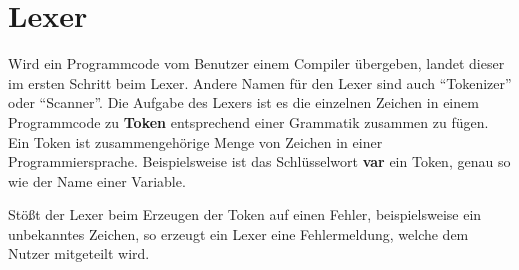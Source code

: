 \section{Lexer}
Wird ein Programmcode vom Benutzer einem Compiler übergeben, landet dieser im ersten Schritt beim Lexer. Andere Namen für den Lexer sind auch \enquote{Tokenizer} oder \enquote{Scanner}. Die Aufgabe des Lexers ist es die einzelnen Zeichen in einem Programmcode zu \textbf{Token} entsprechend einer Grammatik zusammen zu fügen. Ein Token ist zusammengehörige Menge von Zeichen in einer Programmiersprache. Beispielsweise ist das Schlüsselwort \textbf{var} ein Token, genau so wie der Name einer Variable. 

Stößt der Lexer beim Erzeugen der Token auf einen Fehler, beispielsweise ein unbekanntes Zeichen, so erzeugt ein Lexer eine Fehlermeldung, welche dem Nutzer mitgeteilt wird.